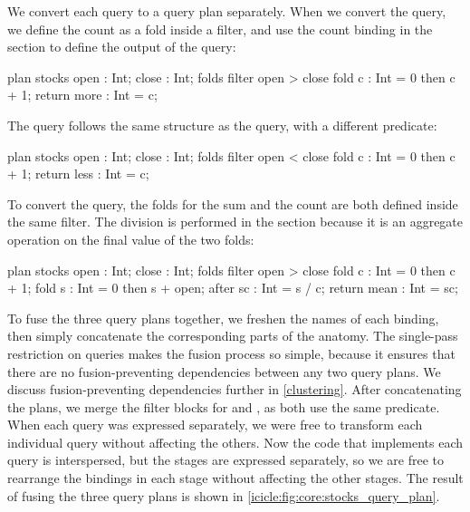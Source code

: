 We convert each query to a query plan separately.
When we convert the \IcC@more@ query, we define the count as a fold inside a filter, and use the count binding in the \IcC@return@ section to define the output of the query:

\begin{icicle-core}
plan stocks { open : Int; close : Int; }
folds {
  filter open > close {
    fold c    : Int = 0 then c + 1; } }
return { more : Int = c; }
\end{icicle-core}

The \IcC@less@ query follows the same structure as the \IcC@more@ query, with a different predicate:

\begin{icicle-core}
plan stocks { open : Int; close : Int; }
folds {
  filter open < close {
    fold c    : Int = 0 then c + 1; } }
return { less : Int = c; }
\end{icicle-core}

To convert the \IcC@mean@ query, the folds for the sum and the count are both defined inside the same filter.
The division is performed in the \IcC@after@ section because it is an aggregate operation on the final value of the two folds:

\begin{icicle-core}
plan stocks { open : Int; close : Int; }
folds {
  filter open > close {
    fold c    : Int = 0 then c + 1;
    fold s    : Int = 0 then s + open; } }
after  { sc   : Int = s / c; }
return { mean : Int = sc; }
\end{icicle-core}

To fuse the three query plans together, we freshen the names of each binding, then simply concatenate the corresponding parts of the anatomy.
The single-pass restriction on queries makes the fusion process so simple, because it ensures that there are no fusion-preventing dependencies between any two query plans. 
We discuss fusion-preventing dependencies further in \cref{clustering}.
After concatenating the plans, we merge the filter blocks for \IcC@more@ and \IcC@mean@, as both use the same predicate.
When each query was expressed separately, we were free to transform each individual query without affecting the others.
Now the code that implements each query is interspersed, but the stages are expressed separately, so we are free to rearrange the bindings in each stage without affecting the other stages.
The result of fusing the three query plans is shown in \cref{icicle:fig:core:stocks_query_plan}.

